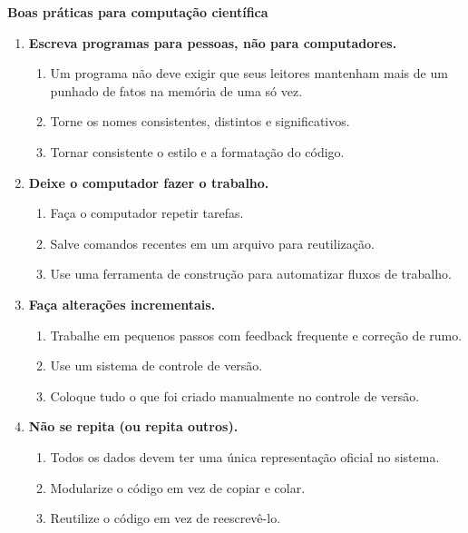 \vspace{0.5cm}
\begin{tcolorbox}

\textbf{Boas práticas para computação científica}

\begin{enumerate}
\item \textbf{Escreva programas para pessoas, não para computadores.}
    \begin{enumerate}
        \item Um programa não deve exigir que seus leitores mantenham mais de um punhado de fatos na memória de uma só vez.
        \item Torne os nomes consistentes, distintos e significativos.
        \item Tornar consistente o estilo e a formatação do código.
    \end{enumerate}

\item \textbf{Deixe o computador fazer o trabalho.}
    \begin{enumerate}
        \item Faça o computador repetir tarefas.
        \item Salve comandos recentes em um arquivo para reutilização.
        \item Use uma ferramenta de construção para automatizar fluxos de trabalho.
    \end{enumerate}

\item \textbf{Faça alterações incrementais.}
    \begin{enumerate}
        \item Trabalhe em pequenos passos com feedback frequente e correção de rumo.
        \item Use um sistema de controle de versão.
        \item Coloque tudo o que foi criado manualmente no controle de versão.
    \end{enumerate}

\item \textbf{Não se repita (ou repita outros).}
    \begin{enumerate}
        \item Todos os dados devem ter uma única representação oficial no sistema.
        \item Modularize o código em vez de copiar e colar.
        \item Reutilize o código em vez de reescrevê-lo.
    \end{enumerate}


\end{enumerate}
\end{tcolorbox}
